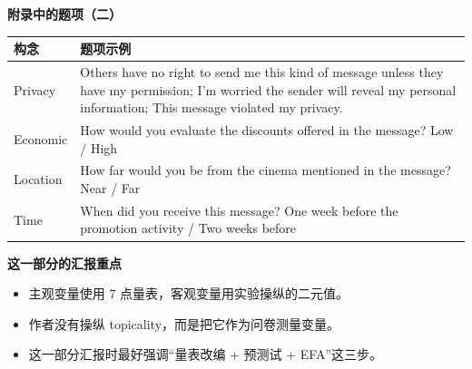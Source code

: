\documentclass[aspectratio=169,UTF8,zihao=-4]{ctexbeamer}
\newcommand{\bigidea}[1]{
  \begin{center}
    \vspace{0.8em}
    {\LARGE \bfseries #1}
    \vspace{0.6em}
  \end{center}
}
\begin{document}
\begin{frame}
  \bigidea{附录中的题项（二）}
  \scriptsize
  \begin{tabular}{p{2.2cm}p{7.6cm}}
    \toprule
    构念 & 题项示例 \\
    \midrule
    Privacy & Others have no right to send me this kind of message unless they have my permission; I'm worried the sender will reveal my personal information; This message violated my privacy. \\
    Economic & How would you evaluate the discounts offered in the message? Low / High \\
    Location & How far would you be from the cinema mentioned in the message? Near / Far \\
    Time & When did you receive this message? One week before the promotion activity / Two weeks before \\
    \bottomrule
  \end{tabular}
\end{frame}

\begin{frame}
  \bigidea{这一部分的汇报重点}
  \begin{itemize}
    \item \Large 主观变量使用 7 点量表，客观变量用实验操纵的二元值。
    \item \Large 作者没有操纵 topicality，而是把它作为问卷测量变量。
    \item \Large 这一部分汇报时最好强调“量表改编 + 预测试 + EFA”这三步。
  \end{itemize}
\end{frame}
\end{document}
